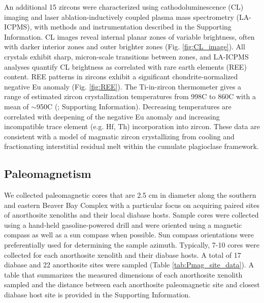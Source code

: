 An additional 15 zircons were characterized using cathodoluminescence (CL) imaging and laser ablation-inductively coupled plasma mass spectrometry (LA-ICPMS), with methods and instrumentation described in the Supporting Information. CL images reveal internal planar zones of variable brightness, often with darker interior zones and outer brighter zones (Fig. \ref{fig:CL_image}). All crystals exhibit sharp, micron-scale transitions between zones, and LA-ICPMS analyses quantify CL brightness as correlated with rare earth elements (REE) content. REE patterns in zircons exhibit a significant chondrite-normalized negative Eu anomaly (Fig. \ref{fig:REE}). The Ti-in-zircon thermometer gives a range of estimated zircon crystallization temperatures from 998\textdegree C to 860\textdegree C with a mean of $\sim$950\textdegree C (\cite{Ferry2007a}; Supporting Information). Decreasing temperatures are correlated with deepening of the negative Eu anomaly and increasing incompatible trace element (e.g. Hf, Th) incorporation into zircon. These data are consistent with a model of magmatic zircon crystallizing from cooling and fractionating interstitial residual melt within the cumulate plagioclase framework.

\subsection{Paleomagnetism}

We collected paleomagnetic cores that are 2.5 cm in diameter along the southern and eastern Beaver Bay Complex with a particular focus on acquiring paired sites of anorthosite xenoliths and their local diabase hosts. Sample cores were collected using a hand-held gasoline-powered drill and were oriented using a magnetic compass as well as a sun compass when possible. Sun compass orientations were preferentially used for determining the sample azimuth. Typically, 7-10 cores were collected for each anorthosite xenolith and their diabase hosts. A total of 17 diabase and 22 anorthosite sites were sampled (Table \ref{tab:Pmag_site_data}). A table that summarizes the measured dimensions of each anorthosite xenolith sampled and the distance between each anorthosite paleomagnetic site and closest diabase host site is provided in the Supporting Information.  

